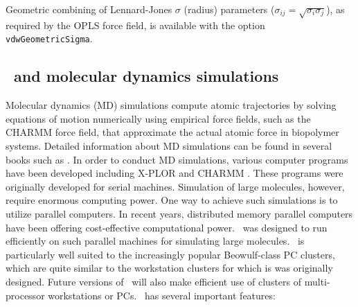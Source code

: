 Geometric combining of Lennard-Jones $\sigma$ (radius) parameters
($\sigma_{ij} = \sqrt{\sigma_i \sigma_j}$), as required by the OPLS force
field, is available with the option {\tt vdwGeometricSigma}.


\subsection{\NAMD\ and molecular dynamics simulations}

Molecular dynamics (MD) simulations compute atomic trajectories by solving
equations of motion numerically using empirical force fields, such as the 
CHARMM force field, that approximate the actual atomic force in 
biopolymer systems. Detailed information about MD simulations can be found in
several books such as 
. 
In order to conduct MD simulations, various computer programs have been 
developed including
X-PLOR  and 
CHARMM .
These programs were originally developed for serial machines. 
Simulation of large molecules, however, require enormous computing power. 
One way to achieve such simulations is to utilize parallel computers. In recent 
years, distributed memory parallel computers have been offering
cost-effective computational power.  \NAMD\ was designed to run efficiently
on such parallel 
machines for simulating large molecules. 
\NAMD\ is particularly well suited to the increasingly popular Beowulf-class PC clusters, which are quite similar to the workstation clusters for which is was originally designed.
Future versions of \NAMD\ will also make efficient use of clusters of multi-processor workstations or PCs.
\prettypar
\NAMD\ has several important features: 


